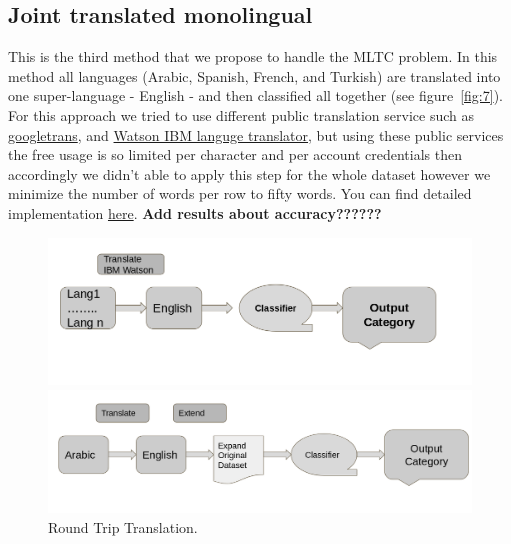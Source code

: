 \documentclass[letterpaper,12pt]{article}
\begin{document}
\subsection{Joint translated monolingual}
This is the third method that we propose to handle the MLTC problem. In this method all languages (Arabic, Spanish, French, and Turkish) are translated into one super-language - English - and then classified all together (see figure~\ref{fig:7}). For this approach we tried to use different public translation service such as \href{https://py-googletrans.readthedocs.io/en/latest/}{googletrans}, and \href{https://www.ibm.com/watson/services/language-translator/}{Watson IBM languge translator}, but using these public services the free usage is so limited per character and per account credentials then accordingly we didn't able to apply this step for the whole dataset however we minimize the number of words per row to fifty words. You can find detailed implementation  \href{https://github.com/Mkamel104/MLTC/blob/master/AllenNlp/AllenNlp_PHASEI_PHASEII_PHASEIII.ipynb}{here}. \textbf{Add results about accuracy??????}


\begin{figure}
	\centering
	\begin{minipage}[b]{.4\textwidth}
		\centering \includegraphics[width=0.8\columnwidth]{trans.png}
		
		\caption{
			\label{fig:7} %
			Joint translated monolingual
		}
		
	\end{minipage}\qquad
	\begin{minipage}[b]{.4\textwidth}
		
		\centering \includegraphics[width=0.8\columnwidth]{5.png}
		
		\caption{
			\label{fig:8} %
			Round Trip Translation.
		}
		
	\end{minipage}
\end{figure}
\end{document}

